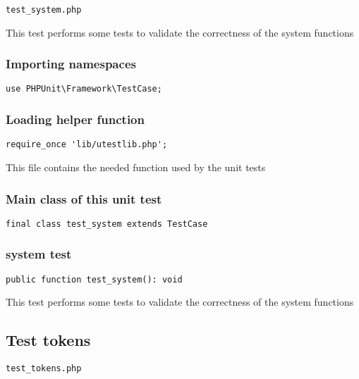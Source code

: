 \documentclass[a4paper]{article}
\begin{document}
\begin{lstlisting}
test_system.php
\end{lstlisting}

This test performs some tests to validate the correctness
of the system functions

\hypertarget{toc347}{}
\subsubsection{Importing namespaces}

\begin{lstlisting}
use PHPUnit\Framework\TestCase;
\end{lstlisting}

\hypertarget{toc348}{}
\subsubsection{Loading helper function}

\begin{lstlisting}
require_once 'lib/utestlib.php';
\end{lstlisting}

This file contains the needed function used by the unit tests

\hypertarget{toc349}{}
\subsubsection{Main class of this unit test}

\begin{lstlisting}
final class test_system extends TestCase
\end{lstlisting}

\hypertarget{toc350}{}
\subsubsection{system test}

\begin{lstlisting}
public function test_system(): void
\end{lstlisting}

This test performs some tests to validate the correctness
of the system functions

\hypertarget{toc351}{}
\subsection{Test tokens}

\begin{lstlisting}
test_tokens.php
\end{lstlisting}
\end{document}
